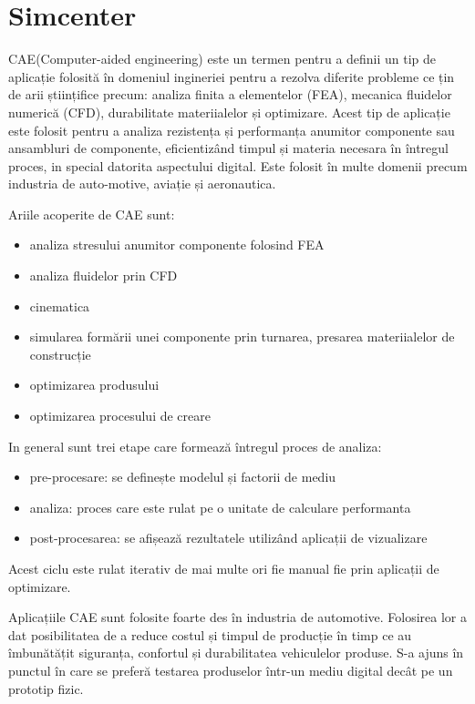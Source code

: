 \newpage
\section{Simcenter}

CAE(Computer-aided engineering) este un termen pentru a definii un tip de aplicație folosită în domeniul ingineriei pentru
 a rezolva diferite probleme ce țin de arii științifice precum: analiza finita a elementelor (FEA), mecanica fluidelor numerică (CFD), 
 durabilitate materiialelor și optimizare. Acest tip de aplicație este folosit pentru a analiza rezistența și performanța anumitor componente 
 sau ansambluri de componente, eficientizând timpul și materia necesara în întregul proces, in special datorita aspectului digital.
Este folosit în multe domenii precum industria de auto-motive, aviație și aeronautica.\newline

Ariile acoperite de CAE sunt:
\begin{itemize}
\item analiza stresului anumitor componente folosind FEA
\item analiza fluidelor prin CFD
\item cinematica
\item simularea formării unei componente prin turnarea, presarea materiialelor de construcție
\item optimizarea produsului 
\item optimizarea procesului de creare
\end{itemize}

In general sunt trei etape care formează întregul proces de analiza:
\begin{itemize}
    \item pre-procesare: se definește modelul și factorii de mediu 
    \item analiza: proces care este rulat pe o unitate de calculare performanta
    \item post-procesarea: se afișează rezultatele utilizând aplicații de vizualizare
\end{itemize}

Acest ciclu este rulat iterativ de mai multe ori fie manual fie prin aplicații de optimizare.\newline

Aplicațiile CAE sunt folosite foarte des în industria de automotive. Folosirea lor a dat posibilitatea de a 
reduce costul și timpul de producție în timp ce au îmbunătățit siguranța, confortul și durabilitatea vehiculelor produse. 
S-a ajuns în punctul în care se preferă testarea produselor într-un mediu digital decât pe un prototip fizic.\newline

